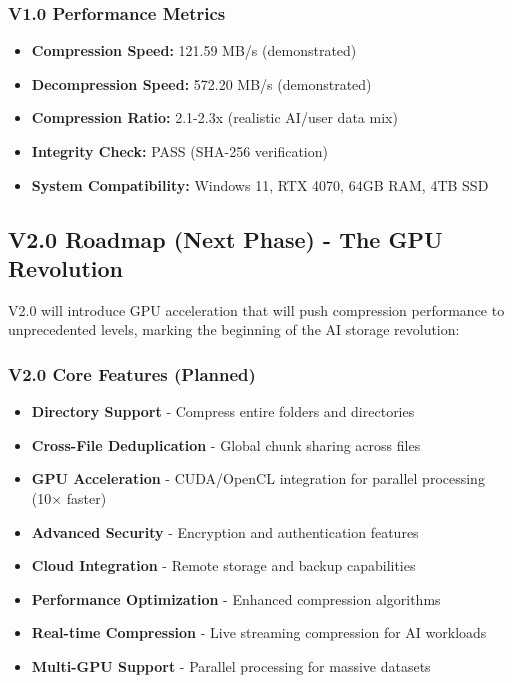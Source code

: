 \documentclass[11pt,a4paper]{article}
\begin{document}
	\subsubsection{V1.0 Performance Metrics}
	\begin{itemize}
		\item \textbf{Compression Speed:} 121.59 MB/s (demonstrated)
		\item \textbf{Decompression Speed:} 572.20 MB/s (demonstrated)
		\item \textbf{Compression Ratio:} 2.1-2.3x (realistic AI/user data mix)
		\item \textbf{Integrity Check:} PASS (SHA-256 verification)
		\item \textbf{System Compatibility:} Windows 11, RTX 4070, 64GB RAM, 4TB SSD
	\end{itemize}

	\subsection{V2.0 Roadmap (Next Phase) - The GPU Revolution}

	V2.0 will introduce GPU acceleration that will push compression performance to unprecedented levels, marking the beginning of the AI storage revolution:

	\subsubsection{V2.0 Core Features (Planned)}
	\begin{itemize}
		\item \textbf{Directory Support} - Compress entire folders and directories
		\item \textbf{Cross-File Deduplication} - Global chunk sharing across files
		\item \textbf{GPU Acceleration} - CUDA/OpenCL integration for parallel processing (10× faster)
		\item \textbf{Advanced Security} - Encryption and authentication features
		\item \textbf{Cloud Integration} - Remote storage and backup capabilities
		\item \textbf{Performance Optimization} - Enhanced compression algorithms
		\item \textbf{Real-time Compression} - Live streaming compression for AI workloads
		\item \textbf{Multi-GPU Support} - Parallel processing for massive datasets
	\end{itemize}
\end{document}
